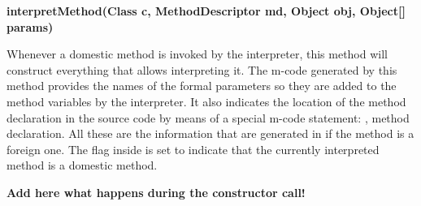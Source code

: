 {\bf{interpretMethod(Class c, MethodDescriptor md, Object obj, Object[] params)}}

Whenever a domestic method is invoked by the interpreter, this method will
construct everything that allows interpreting it. The m-code generated by
this method provides the names of the formal parameters so they are added
to the method variables by the \jel{} interpreter. It also indicates the
location of the method declaration in the source code by means of a special
m-code statement: , method declaration. All these are the information
that are generated in  if the method is a foreign one.
The flag inside is set to indicate that the currently interpreted method
is a domestic method.

{\bf Add here what happens during the constructor call!}